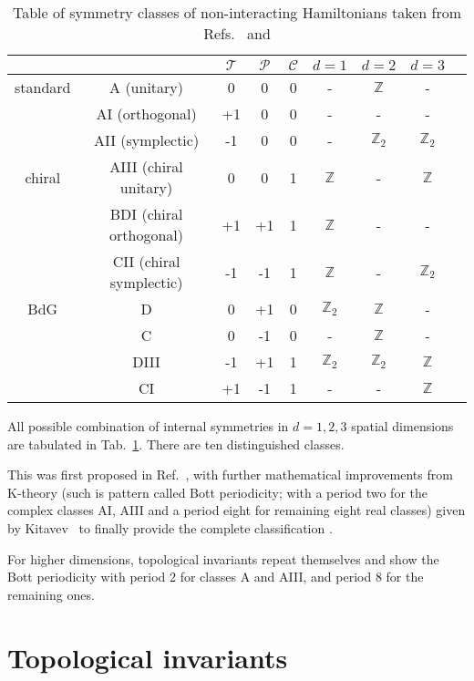 \begin{table}
\centering
\begin{tabular}{|c|c||c|c|c||c|c|c|c|}
\hline
 & & $\mathcal{T}$ & $\mathcal{P}$ & $\mathcal{C}$ & $d = 1$ & $d = 2$ & $d = 3$ \\
\hline
\hline
standard & A (unitary) & 0 & 0 & 0 & - & $\mathbb{Z}$ & - \\ 
\cline{2-8}
 & AI (orthogonal) & +1 & 0 & 0 & - & - & - \\
\cline{2-8}
 & AII (symplectic) & -1 & 0 & 0 & - & $\mathbb{Z}_2$ & $\mathbb{Z}_2$ \\
\hline
\hline
 chiral & AIII (chiral unitary) & 0 & 0 & 1 & $\mathbb{Z}$ & - & $\mathbb{Z}$ \\
\cline{2-8}
 & BDI (chiral orthogonal) & +1 & +1 & 1 & $\mathbb{Z}$ & - & - \\
\cline{2-8}
 & CII (chiral symplectic) & -1 & -1 & 1 & $\mathbb{Z}$ & - & $\mathbb{Z}_2$ \\
\hline
\hline
BdG & D & 0 & +1 & 0 & $\mathbb{Z}_2$ & $\mathbb{Z}$ & - \\
\cline{2-8}
& C & 0 & -1 & 0 & - & $\mathbb{Z}$ & - \\
\cline{2-8}
 & DIII & -1 & +1 & 1 &  $\mathbb{Z}_2$ &  $\mathbb{Z}_2$ &  $\mathbb{Z}$ \\
\cline{2-8}
 & CI & +1 & -1 & 1 & - & - & $\mathbb{Z}$ \\
\hline
\end{tabular}
\caption{Table of symmetry classes of non-interacting Hamiltonians taken from Refs.~\cite{10foldRyu2010} and \cite{10foldKitaev2009}}
\label{tab:10fold}
\end{table}

All possible combination of internal symmetries in $d = 1, 2, 3$ spatial dimensions are tabulated in Tab.~\ref{tab:10fold}. There are ten distinguished classes.

This was first proposed in Ref.~\cite{10foldSchnyder2008}, with further mathematical improvements from K-theory (such is pattern called Bott periodicity; with a period two for the complex classes AI, AIII and a period eight for remaining eight real classes) given by Kitavev~\cite{10foldKitaev2009} to finally provide the complete classification \cite{10foldRyu2010}.

For higher dimensions, topological invariants repeat themselves and show the Bott periodicity with period 2 for classes A and AIII, and period 8 for the remaining ones.

\section{Topological invariants}

